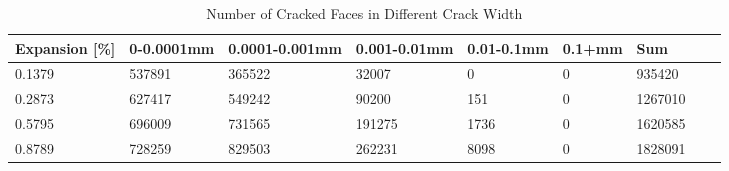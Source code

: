 
\begin{table}[ht!]
    \centering
    \begin{tabular}{| p{2.0cm} | p{1.6cm} | p{1.6cm} | p{1.6cm} | p{1.6cm} | p{1.6cm} | p{1.6cm} | p{1.6cm} | p{2.0cm} | }
    \hline

	Expansion [\%] & 0-0.0001mm & 0.0001-0.001mm & 0.001-0.01mm & 0.01-0.1mm & 0.1+mm & Sum \\ \hline

    0.1379 &	537891 &	365522 &	32007 &	0 &	0 &	935420\\ \hline
    0.2873 &	627417 &	549242 &	90200 &	151 &	0 &	1267010\\ \hline
    0.5795 &	696009 &	731565 &	191275 &	1736 &	0 &	1620585\\ \hline
    0.8789 &	728259 &	829503 &	262231 &	8098 &	0 &	1828091\\ \hline


    \end{tabular}
    \caption{Number of Cracked Faces in Different Crack Width}
    \label{}
\end{table}

